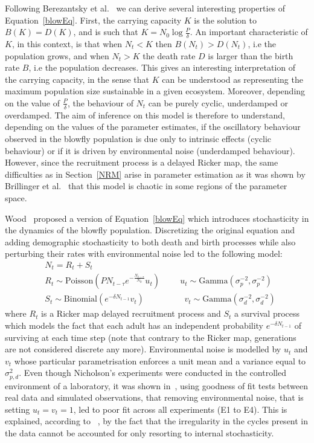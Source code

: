 \documentclass[12pt]{article}
\begin{document}
	Following Berezantsky et al.~\cite{berezansky2010nicholson} we can derive several interesting properties of Equation~\ref{blowEq}. First, the carrying capacity $K$ is the solution to $B(K)=D(K)$, and is such that $K=N_0\log\frac{P}{\delta}$. An important characteristic of $K$, in this context, is that when $N_t < K$ then $B(N_t) > D(N_t)$, i.e the population grows, and when $N_t > K$ the death rate $D$ is larger than the birth rate $B$, i.e the population decreases. This gives an interesting interpretation of the carrying capacity, in the sense that $K$ can be understood as representing the maximum population size sustainable in a given ecosystem. Moreover, depending on the value of $\frac{P}{\delta}$, the behaviour of $N_t$ can be purely cyclic, underdamped or overdamped. The aim of inference on this model is therefore to understand, depending on the values of the parameter estimates, if the oscillatory behaviour observed in the blowfly population is due only to intrinsic effects (cyclic behaviour) or if it is driven by environmental noise (underdamped behaviour). However, since the recruitment process is a delayed Ricker map, the same difficulties  as in Section~\ref{NRM} arise in parameter estimation as it was shown by Brillinger et al.~\cite{brillinger1980empirical} that this model is chaotic in some regions of the parameter space.
	
	Wood~\cite{wood2010statistical} proposed a version of Equation~\ref{blowEq} which introduces stochasticity in the dynamics of the blowfly population. Discretizing the original equation and adding demographic stochasticity to both death and birth processes while also perturbing their rates with environmental noise led to the following model:
	\begin{align}
	& N_t = R_t + S_t \\
	& R_t \sim  \mathrm{Poisson}(PN_{t-\tau}e^{-\frac{N_{t-\tau}}{N_0}}u_t)  \hspace{1cm} u_t \sim \mathrm{Gamma}(\sigma_p^{-2}, \sigma_p^{-2})\\ 
	& S_t \sim \mathrm{Binomial}(e^{-\delta N_{t-1}}v_t) \hspace{2cm}  v_t \sim \mathrm{Gamma}(\sigma_d^{-2}, \sigma_d^{-2}) 
	\end{align}
	where $R_t$ is a Ricker map delayed recruitment process and $S_t$ a survival process which models the fact that each adult has
	an independent probability $e^{-\delta N_{t-1}}$ of surviving at each time step (note that contrary to the Ricker map, generations are not considered discrete any more). Environmental noise is modelled by $u_t$ and $v_t$ whose particular parametrisation enforces a unit mean and a variance equal to $\sigma_{p,d}^2$. Even though Nicholson's experiments were conducted in the controlled environment of a laboratory, it was shown in~\cite{wood2010statistical}, using goodness of fit tests between real data and simulated observations, that removing environmental noise, that is setting $u_t=v_t=1$, led to poor fit across all experiments (E1 to E4). This is explained, according to ~\cite{wood2010statistical}, by the fact that the irregularity in the cycles present in the data cannot be accounted for only resorting to internal stochasticity.
\end{document}
